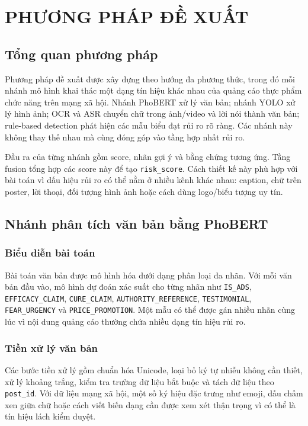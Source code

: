 \chapter{PHƯƠNG PHÁP ĐỀ XUẤT}

\section{Tổng quan phương pháp}
Phương pháp đề xuất được xây dựng theo hướng đa phương thức, trong đó mỗi nhánh mô hình khai thác một dạng tín hiệu khác nhau của quảng cáo thực phẩm chức năng trên mạng xã hội. Nhánh PhoBERT xử lý văn bản; nhánh YOLO xử lý hình ảnh; OCR và ASR chuyển chữ trong ảnh/video và lời nói thành văn bản; rule-based detection phát hiện các mẫu biểu đạt rủi ro rõ ràng. Các nhánh này không thay thế nhau mà cùng đóng góp vào tầng hợp nhất rủi ro.

Đầu ra của từng nhánh gồm score, nhãn gợi ý và bằng chứng tương ứng. Tầng fusion tổng hợp các score này để tạo \texttt{risk\_score}. Cách thiết kế này phù hợp với bài toán vì dấu hiệu rủi ro có thể nằm ở nhiều kênh khác nhau: caption, chữ trên poster, lời thoại, đối tượng hình ảnh hoặc cách dùng logo/biểu tượng uy tín.

\section{Nhánh phân tích văn bản bằng PhoBERT}
\subsection{Biểu diễn bài toán}
Bài toán văn bản được mô hình hóa dưới dạng phân loại đa nhãn. Với mỗi văn bản đầu vào, mô hình dự đoán xác suất cho từng nhãn như \texttt{IS\_ADS}, \texttt{EFFICACY\_CLAIM}, \texttt{CURE\_CLAIM}, \texttt{AUTHORITY\_REFERENCE}, \texttt{TESTIMONIAL}, \texttt{FEAR\_URGENCY} và \texttt{PRICE\_PROMOTION}. Một mẫu có thể được gán nhiều nhãn cùng lúc vì nội dung quảng cáo thường chứa nhiều dạng tín hiệu rủi ro.

\subsection{Tiền xử lý văn bản}
Các bước tiền xử lý gồm chuẩn hóa Unicode, loại bỏ ký tự nhiễu không cần thiết, xử lý khoảng trắng, kiểm tra trường dữ liệu bắt buộc và tách dữ liệu theo \texttt{post\_id}. Với dữ liệu mạng xã hội, một số ký hiệu đặc trưng như emoji, dấu chấm xen giữa chữ hoặc cách viết biến dạng cần được xem xét thận trọng vì có thể là tín hiệu lách kiểm duyệt.

